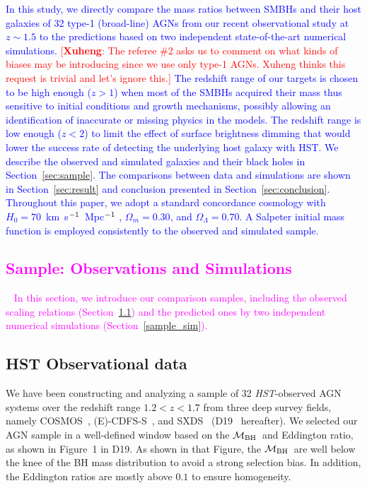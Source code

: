 \documentclass[twocolumn,trackchanges]{aastex63}
\newcommand{\hst}{{\it HST}}
\newcommand{\mbh}{$\mathcal M_{\rm BH}$}
\newcommand{\kmsMpc}{km~s$^{\rm -1}$~Mpc$^{\rm -1}$}
\newcommand{\ding}[1]{\textcolor{red}{[{\bf Xuheng}: #1]}}
\newcommand{\blue}[1]{{ \textcolor{blue}{#1}}}
\newcommand{\pink}[1]{{ \textcolor{magenta}{#1}}}
\begin{document}
\blue{
In this study, we directly compare the mass ratios between SMBHs and their host galaxies of 32 type-1 (broad-line) AGNs from our recent observational study at $z\sim1.5$ \citep{Ding2019} to the predictions based on two independent state-of-the-art numerical simulations.}
\ding{The referee \#2 asks us to comment on what kinds of biases may be introducing since we use only type-1 AGNs. Xuheng thinks this request is trivial and let's ignore this.}
\blue{The redshift range of our targets is chosen to be high enough ($z>1$) when most of the SMBHs acquired their mass thus sensitive to initial
conditions and growth mechanisms, possibly allowing an identification of inaccurate or missing physics in the models. The redshift range is low enough ($z<2$) to limit the effect of surface brightness dimming that would lower the success rate of detecting the underlying host galaxy with HST. We describe the observed and simulated galaxies and their black holes in Section~\ref{sec:sample}. The comparisons between data and simulations are shown in Section~\ref{sec:result} and conclusion presented in Section~\ref{sec:conclusion}. Throughout this paper, we adopt a standard concordance
cosmology with $H_0 = 70$~\kmsMpc
, $\Omega_m = 0.30$,
and $\Omega_\Lambda = 0.70$. A Salpeter initial mass function is employed consistently to the
observed and simulated sample.
}

\pink{
\section{Sample: Observations and Simulations}~\label{sec:sample}
In this section, we introduce our comparison samples, including the observed scaling relations (Section~\ref{hst_sample}) and the predicted ones by two independent numerical simulations (Section~\ref{sample_sim}).}
	
\subsection{HST Observational data}\label{hst_sample}
	
We have been constructing and analyzing a sample of 32 \hst-observed AGN systems over the redshift range $1.2<z<1.7$ from three deep survey fields, namely COSMOS~\citep{Civano2016}, (E)-CDFS-S~\citep{Lehmer2005, Xue2011}, and SXDS~\citep{Ueda2008} (D19~\citep{Ding2019} hereafter).
We selected our AGN sample in a well-defined window based on the \mbh\ and Eddington ratio, as shown in Figure~1 in D19. As shown in that Figure, the \mbh\ are well below the knee of the BH mass distribution to avoid a strong selection bias. In addition, the Eddington ratios are mostly above $0.1$ to ensure homogeneity.
\end{document}
